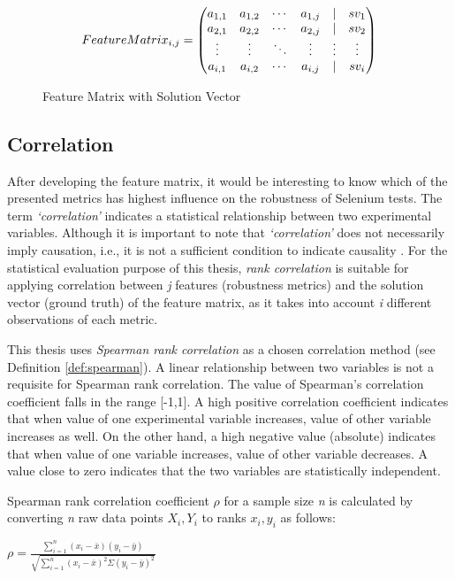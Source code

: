 \begin{figure}[ht]
\[
Feature\smallskip Matrix_{i,j} = 
\begin{pmatrix}
  a_{1,1} & a_{1,2} & \cdots & a_{1,j} & | & \textit{$sv_{1}$}\\
  a_{2,1} & a_{2,2} & \cdots & a_{2,j} & | & \textit{$sv_{2}$}\\
  \vdots  & \vdots  & \ddots & \vdots  & \vdots & \vdots \\
  a_{i,1} & a_{i,2} & \cdots & a_{i,j} & | & \textit{$sv_{i}$}
\end{pmatrix}
\]
\caption{Feature Matrix with Solution Vector}
\label{fig:featurematrix}
\end{figure}

\subsection*{Correlation}
After developing the feature matrix, it would be interesting to know which of the presented metrics has highest influence on the robustness of Selenium tests. The term \textit{`correlation'} indicates a statistical relationship between two experimental variables. Although it is important to note that \textit{`correlation'} does not necessarily imply causation, i.e., it is not a sufficient condition to indicate causality \cite{corrcausality}. For the statistical evaluation purpose of this thesis, \textit{rank correlation} is suitable for applying correlation between \textit{j} features (robustness metrics) and the solution vector (ground truth) of the feature matrix, as it takes into account \textit{i} different observations of each metric. 

This thesis uses \textit{Spearman rank correlation} as a chosen correlation method (see Definition \ref{def:spearman}). A linear relationship between two variables is not a requisite for Spearman rank correlation. The value of Spearman's correlation coefficient falls in the range [-1,1]. A high positive correlation coefficient indicates that when value of one experimental variable increases, value of other variable increases as well. On the other hand, a high negative value (absolute) indicates that when value of one variable increases, value of other variable decreases. A value close to zero indicates that the two variables are statistically independent. 
\theoremstyle{definition}
\begin{definition}{Spearman rank correlation coefficient $\rho$ for a sample size \textit{n} is calculated by converting \textit{n} raw data points \textit{$X_i,Y_i$} to ranks \textit{$x_i,y_i$} as follows:}

\begin{center}\Large
$\rho = \frac{\sum\limits_{i=1}^{n}(x_i - \bar{x})(y_i - \bar{y})}{\sqrt{\sum\limits_{i=1}^{n}(x_i - \bar{x})^2\Sigma(y_i - \bar{y})^2}}$
\end{center}
\label{def:spearman}
\end{definition}

